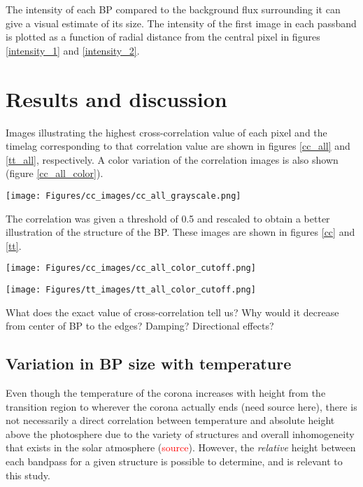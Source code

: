 \documentclass[preprint]{aastex}   %
\begin{document}
The intensity of each BP compared to the background flux surrounding it
can give a visual estimate
of its size. The intensity of the first image in each
passband is plotted as a function of radial distance from the central pixel in figures
\ref{intensity_1} and \ref{intensity_2}.


\section{Results and discussion}\label{results}
Images illustrating the highest cross-correlation value of each pixel and the
timelag corresponding to that correlation value are shown in figures \ref{cc_all}
and \ref{tt_all}, respectively. A color variation of the correlation images
is also shown (figure \ref{cc_all_color}).

\begin{figure*}[htb!]
    \texttt{[image: Figures/cc\_images/cc\_all\_grayscale.png]}
    \caption{Images showing the highest cross-correlation value for each pixel. }
    \label{cc_all}
\end{figure*}

The correlation was given a threshold of 0.5 and rescaled to obtain a
better illustration of the structure of the BP. These images are shown in
figures \ref{cc} and \ref{tt}.

\begin{figure*}[htb!]
    \texttt{[image: Figures/cc\_images/cc\_all\_color\_cutoff.png]}
    \caption{Cross-correlation images scaled to show only values higher than 0.5.}
    \label{cc}
\end{figure*}
\begin{figure*}[htb!]
    \texttt{[image: Figures/tt\_images/tt\_all\_color\_cutoff.png]}
    \caption{Timelag corresponding to the cross-correlation values higher than 0.5.}
    \label{tt}
\end{figure*}

What does the exact value of cross-correlation tell us? Why would it decrease
from center of BP to the edges? Damping? Directional effects?


\subsection{Variation in BP size with temperature}
Even though the temperature of the corona increases with height from the transition
region to wherever the corona actually ends (need source here), there is not necessarily
a direct correlation between temperature and absolute height above the photosphere
due to the variety of structures
and overall inhomogeneity that exists in the solar atmosphere (\textcolor{red}{source}).
However, the \emph{relative} height between each bandpass for a given structure is
possible to determine, and is relevant to this study.
\end{document}

